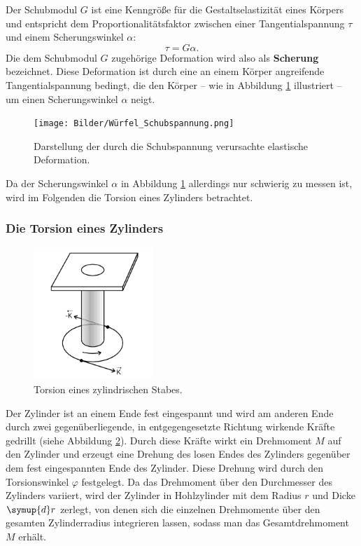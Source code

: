 Der Schubmodul $G$ ist eine Kenngröße für die Gestaltselastizität eines Körpers und entspricht
dem Proportionalitätsfaktor zwischen einer Tangentialspannung $\tau$ und einem Scherungswinkel
$\alpha$:
\begin{equation}
	\label{eqn:schubimoduli}
	\tau = G \alpha \mathrm{.}
\end{equation}
Die dem Schubmodul $G$ zugehörige Deformation wird also als \textbf{Scherung} bezeichnet.
Diese Deformation ist durch eine an einem Körper angreifende Tangentialspannung bedingt, die
den Körper -- wie in Abbildung \ref{fig:würfeli} illustriert -- um einen Scherungswinkel $\alpha$
neigt.
\begin{figure}
	\centering
	\texttt{[image: Bilder/Würfel\_Schubspannung.png]}
	\caption{Darstellung der durch die Schubspannung verursachte elastische Deformation. \cite{Anleitung}}
	\label{fig:würfeli}
\end{figure}
Da der Scherungswinkel $\alpha$ in Abbildung \ref{fig:würfeli} allerdings nur schwierig zu messen
ist, wird im Folgenden die Torsion eines Zylinders betrachtet.

\FloatBarrier
\subsubsection{Die Torsion eines Zylinders}
\label{sec:torsionii}
\begin{figure}
	\centering
	\includegraphics[width=0.4\textwidth]{Bilder/Torsion_Schubmodul.png}
	\caption{Torsion eines zylindrischen Stabes. \cite{Anleitung}}
	\label{fig:torsioni}
\end{figure}
Der Zylinder ist an einem Ende fest eingespannt und wird am anderen Ende durch zwei
gegenüberliegende, in entgegengesetzte Richtung wirkende Kräfte gedrillt (siehe Abbildung
\ref{fig:torsioni}).
Durch diese Kräfte wirkt ein Drehmoment $M$ auf den Zylinder und erzeugt eine Drehung des losen
Endes des Zylinders gegenüber dem fest eingespannten Ende des Zylinder. Diese Drehung wird
durch den Torsionswinkel $\varphi$ festgelegt.
Da das Drehmoment über den Durchmesser des Zylinders variiert, wird der Zylinder in Hohlzylinder
mit dem Radius $r$ und Dicke $\symup{d} r$ zerlegt, von denen sich die einzelnen Drehmomente
über den gesamten Zylinderradius integrieren lassen, sodass man das Gesamtdrehmoment $M$
erhält.

